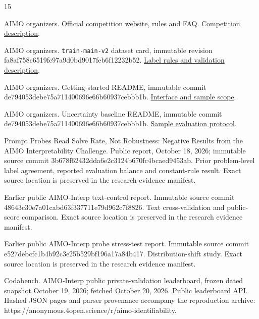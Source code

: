 \begin{thebibliography}{15}

\small\raggedright

 AIMO organizers. Official competition website, rules and FAQ. \href{https://aimo-interp.github.io/}{Competition description}.

 AIMO organizers. \texttt{train-main-v2} dataset card, immutable revision fa8af758c6519fc97a9d0bd9017feb6f12232b52. \href{https://huggingface.co/datasets/aimo-interp/train-main-v2/blob/fa8af758c6519fc97a9d0bd9017feb6f12232b52/README.md}{Label rules and validation description}.

 AIMO organizers. Getting-started README, immutable commit de794053debe75a711400696e66b60937cebbb1b. \href{https://github.com/aimo-interp/getting-started/blob/de794053debe75a711400696e66b60937cebbb1b/README.md}{Interface and sample scope}.

 AIMO organizers. Uncertainty baseline README, immutable commit de794053debe75a711400696e66b60937cebbb1b. \href{https://github.com/aimo-interp/getting-started/blob/de794053debe75a711400696e66b60937cebbb1b/solutions/uncertainty-profiling/README.md}{Sample evaluation protocol}.

 Prompt Probes Read Solve Rate, Not Robustness: Negative Results from the AIMO Interpretability Challenge. Public report, October 18, 2026; immutable source commit 3b678f62432dda6e2c3124b670fc4bcaed9453ab. Prior problem-level label agreement, reported evaluation balance and constant-rule result. Exact source location is preserved in the research evidence manifest.

 Earlier public AIMO-Interp text-control report. Immutable source commit 48643c30e7a01cabd63f337711e79d962c7f8826. Text cross-validation and public-score comparison. Exact source location is preserved in the research evidence manifest.

 Earlier public AIMO-Interp probe stress-test report. Immutable source commit e527debcfc1b4b92c3e25b529bf196a17a84b417. Distribution-shift study. Exact source location is preserved in the research evidence manifest.

 Codabench. AIMO-Interp public private-validation leaderboard, frozen dated snapshot October 19, 2026; fetched October 20, 2026. \href{https://www.codabench.org/api/phases/30038/get_leaderboard/}{Public leaderboard API}. Hashed JSON pages and parser provenance accompany the reproduction archive: https://anonymous.4open.science/r/aimo-identifiability.


\end{thebibliography}
